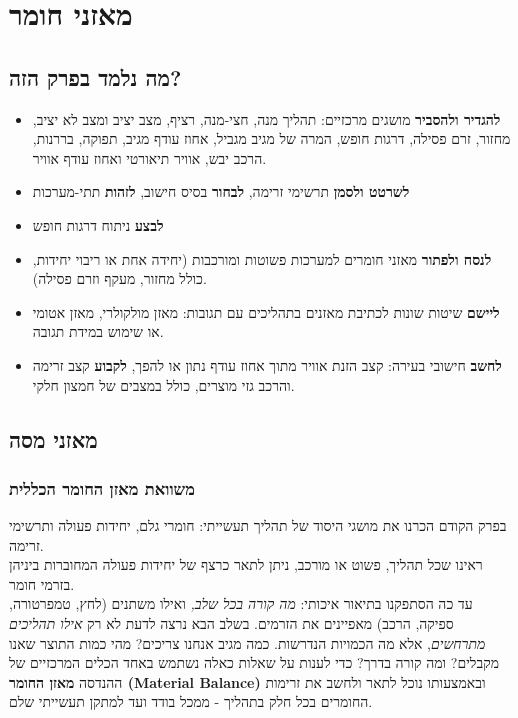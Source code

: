 \documentclass[
  hebrew,
  letterpaper,
  DIV=11,
  numbers=noendperiod]{scrreprt}
\begin{document}

\chapter{מאזני
חומר}\label{ux5deux5d0ux5d6ux5e0ux5d9-ux5d7ux5d5ux5deux5e8}

\section{מה נלמד בפרק
הזה?}\label{ux5deux5d4-ux5e0ux5dcux5deux5d3-ux5d1ux5e4ux5e8ux5e7-ux5d4ux5d6ux5d4-2}

\begin{itemize}
\item
  \textbf{להגדיר ולהסביר} מושגים מרכזיים: תהליך מנה, חצי-מנה, רציף, מצב
  יציב ומצב לא יציב, מחזור, זרם פסילה, דרגות חופש, המרה של מגיב מגביל,
  אחוז עודף מגיב, תפוקה, בררנות, הרכב יבש, אוויר תיאורטי ואחוז עודף
  אוויר.
\item
  \textbf{לשרטט ולסמן} תרשימי זרימה, \textbf{לבחור} בסיס חישוב,
  \textbf{לזהות} תתי-מערכות
\item
  \textbf{לבצע} ניתוח דרגות חופש
\item
  \textbf{לנסח ולפתור} מאזני חומרים למערכות פשוטות ומורכבות (יחידה אחת
  או ריבוי יחידות, כולל מחזור, מעקף וזרם פסילה).
\item
  \textbf{ליישם} שיטות שונות לכתיבת מאזנים בתהליכים עם תגובות: מאזן
  מולקולרי, מאזן אטומי או שימוש במידת תגובה.
\item
  \textbf{לחשב} חישובי בעירה: קצב הזנת אוויר מתוך אחוז עודף נתון או
  להפך, \textbf{לקבוע} קצב זרימה והרכב גזי מוצרים, כולל במצבים של חמצון
  חלקי.
\end{itemize}

\section{מאזני מסה}\label{ux5deux5d0ux5d6ux5e0ux5d9-ux5deux5e1ux5d4}

\subsection{משוואת מאזן החומר
הכללית}\label{ux5deux5e9ux5d5ux5d5ux5d0ux5ea-ux5deux5d0ux5d6ux5df-ux5d4ux5d7ux5d5ux5deux5e8-ux5d4ux5dbux5dcux5dcux5d9ux5ea}

בפרק הקודם הכרנו את מושגי היסוד של תהליך תעשייתי: חומרי גלם, יחידות
פעולה ותרשימי זרימה.\\
ראינו שכל תהליך, פשוט או מורכב, ניתן לתאר כרצף של יחידות פעולה המחוברות
ביניהן בזרמי חומר.\\
עד כה הסתפקנו בתיאור איכותי: \emph{מה קורה בכל שלב,} ואילו משתנים (לחץ,
טמפרטורה, ספיקה, הרכב) מאפיינים את הזרמים. בשלב הבא נרצה לדעת לא רק
\emph{אילו תהליכים מתרחשים}, אלא מה הכמויות הנדרשות. כמה מגיב אנחנו
צריכים? מהי כמות התוצר שאנו מקבלים? ומה קורה בדרך? כדי לענות על שאלות
כאלה נשתמש באחד הכלים המרכזיים של ההנדסה \textbf{מאזן החומר (Material
Balance)} ובאמצעותו נוכל לתאר ולחשב את זרימות החומרים בכל חלק בתהליך -
ממכל בודד ועד למתקן תעשייתי שלם.
\end{document}
